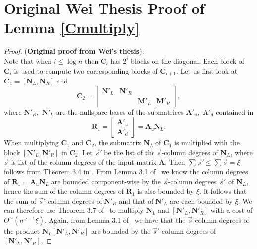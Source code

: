 \documentclass[a4paper,11pt]{article}
\begin{document}
\section{Original Wei Thesis Proof of Lemma \ref{Cmultiply}}
\begin{proof}
({\bf Original proof from Wei's thesis}):\\
Note that when $i\le\log n$ then $\mathbf{C}_{i}$ has $2^{i}$ blocks
on the diagonal. Each block of $\mathbf{C}_{i}$ is used to compute
two corresponding blocks of $\mathbf{C}_{i+1}$. Let us first look
at $\mathbf{C}_{1}=\left[\mathbf{N}_{L},\mathbf{N}_{R}\right]$ and
\[
\mathbf{C}_{2}=\begin{bmatrix}\mathbf{N}'_{L} & \mathbf{N}'_{R}\\
 &  & \mathbf{M}'_{L} & \mathbf{M}'_{R}
\end{bmatrix},
\]
 where $\mathbf{N}'_{R},$ $\mathbf{N}'_{L}$ are the nullspace bases
of the submatrices $\mathbf{A}'_{u},$ $\mathbf{A}'_{d}$ contained
in 
\[
\mathbf{R}_{1}=\begin{bmatrix}\mathbf{A}'_{u}\\
\mathbf{A}'_{d}
\end{bmatrix}=\mathbf{A}_{u}\mathbf{N}_{L}.
\]
When multiplying $\mathbf{C}_{1}$ and $\mathbf{C}_{2}$, the submatrix
$\mathbf{N}_{L}$ of $\mathbf{C}_{1}$ is multiplied with the block
$\left[\mathbf{N}'_{L},\mathbf{N}'_{R}\right]$ in $\mathbf{C}_{2}$.
Let $\vec{s}'$ be the list of the $\vec{s}$-column degrees of $\mathbf{N}_{L}$,
where $\vec{s}$ is list of the column degrees of the input matrix
$\mathbf{A}$. Then $\sum\vec{s}'\le\sum\vec{s}=\xi$ follows from Theorem 3.4 in 
\cite{zhou-labahn-storjohann:12}.
From Lemma 3.1 of~\cite{zhou-labahn-storjohann:12} we know the column degrees
of $\mathbf{R}_{1}=\mathbf{A}_{u}\mathbf{N}_{L}$ are bounded component-wise
by the $\vec{s}$-column degrees $\vec{s}'$ of $\mathbf{N}_{L}$,
hence the sum of the column degrees of $\mathbf{R}_{1}$ is also bounded
by $\xi$. It follows that the sum of $\vec{s}'$-column degrees of
$\mathbf{N}'_{R}$ and that of $\mathbf{N}'_{L}$ are each bounded
by $\xi$. We can therefore use Theorem 3.7 of~\cite{zhou-labahn-storjohann:12}
to multiply $\mathbf{N}_{L}$ and $\left[\mathbf{N}'_{L},\mathbf{N}'_{R}\right]$
with a cost of $O^{\sim}\left(n^{\omega-1}\xi\right)$. Again, from Lemma 3.1 
of~\cite[page 368]{zhou-labahn-storjohann:12} we have that 
the $\vec{s}$-column degrees of the product $\mathbf{N}_{L}\left[\mathbf{N}'_{L},\mathbf{N}'_{R}\right]$
are bounded by the $\vec{s}'$-column degrees of $\left[\mathbf{N}'_{L},\mathbf{N}'_{R}\right]$,

\end{proof}
\end{document}
